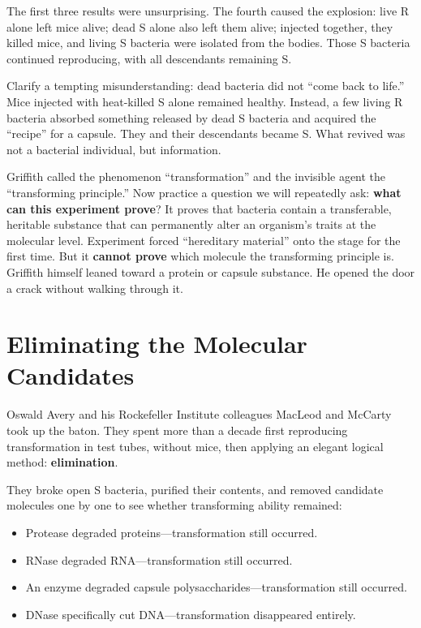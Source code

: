 The first three results were unsurprising. The fourth caused the explosion: live R alone left mice alive; dead S alone also left them alive; injected together, they killed mice, and living S bacteria were isolated from the bodies. Those S bacteria continued reproducing, with all descendants remaining S.

Clarify a tempting misunderstanding: dead bacteria did not ``come back to life.'' Mice injected with heat-killed S alone remained healthy. Instead, a few living R bacteria absorbed something released by dead S bacteria and acquired the ``recipe'' for a capsule. They and their descendants became S. What revived was not a bacterial individual, but information.

Griffith called the phenomenon ``transformation'' and the invisible agent the ``transforming principle.'' Now practice a question we will repeatedly ask: \textbf{what can this experiment prove}? It proves that bacteria contain a transferable, heritable substance that can permanently alter an organism's traits at the molecular level. Experiment forced ``hereditary material'' onto the stage for the first time. But it \textbf{cannot prove} which molecule the transforming principle is. Griffith himself leaned toward a protein or capsule substance. He opened the door a crack without walking through it.

\section{Eliminating the Molecular Candidates}

Oswald Avery and his Rockefeller Institute colleagues MacLeod and McCarty took up the baton. They spent more than a decade first reproducing transformation in test tubes, without mice, then applying an elegant logical method: \textbf{elimination}.

They broke open S bacteria, purified their contents, and removed candidate molecules one by one to see whether transforming ability remained:

\begin{itemize}[itemsep=2pt]
\item Protease degraded proteins---transformation still occurred.
\item RNase degraded RNA---transformation still occurred.
\item An enzyme degraded capsule polysaccharides---transformation still occurred.
\item DNase specifically cut DNA---transformation disappeared entirely.
\end{itemize}

